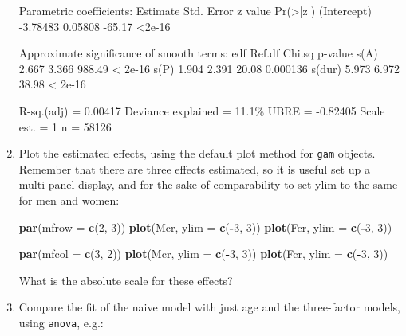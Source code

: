 \documentclass[
]{book}
\newenvironment{Shaded}{\begin{snugshade}}{\end{snugshade}}
\newcommand{\AttributeTok}[1]{\textcolor[rgb]{0.13,0.29,0.53}{#1}}
\newcommand{\DecValTok}[1]{\textcolor[rgb]{0.00,0.00,0.81}{#1}}
\newcommand{\FunctionTok}[1]{\textcolor[rgb]{0.13,0.29,0.53}{\textbf{#1}}}
\newcommand{\NormalTok}[1]{#1}
\newcommand{\SpecialCharTok}[1]{\textcolor[rgb]{0.81,0.36,0.00}{\textbf{#1}}}
\begin{document}
\begin{enumerate}
\begin{Shaded}
\begin{Highlighting}[]
\NormalTok{Parametric coefficients:}
\NormalTok{            Estimate Std. Error z value Pr(\textgreater{}|z|)}
\NormalTok{(Intercept) {-}3.78483    0.05808  {-}65.17   \textless{}2e{-}16}

\NormalTok{Approximate significance of smooth terms:}
\NormalTok{         edf Ref.df Chi.sq  p{-}value}
\NormalTok{s(A)   2.667  3.366 988.49  \textless{} 2e{-}16}
\NormalTok{s(P)   1.904  2.391  20.08 0.000136}
\NormalTok{s(dur) 5.973  6.972  38.98  \textless{} 2e{-}16}

\NormalTok{R{-}sq.(adj) =  0.00417   Deviance explained = 11.1\%}
\NormalTok{UBRE = {-}0.82405  Scale est. = 1         n = 58126}
\end{Highlighting}
\end{Shaded}
\item
  Plot the estimated effects, using the default plot method for
  \texttt{gam} objects. Remember that there are three effects
  estimated, so it is useful set up a multi-panel display, and for
  the sake of comparability to set ylim to the same for men and women:

\begin{Shaded}
\begin{Highlighting}[]
\FunctionTok{par}\NormalTok{(}\AttributeTok{mfrow =} \FunctionTok{c}\NormalTok{(}\DecValTok{2}\NormalTok{, }\DecValTok{3}\NormalTok{))}
\FunctionTok{plot}\NormalTok{(Mcr, }\AttributeTok{ylim =} \FunctionTok{c}\NormalTok{(}\SpecialCharTok{{-}}\DecValTok{3}\NormalTok{, }\DecValTok{3}\NormalTok{))}
\FunctionTok{plot}\NormalTok{(Fcr, }\AttributeTok{ylim =} \FunctionTok{c}\NormalTok{(}\SpecialCharTok{{-}}\DecValTok{3}\NormalTok{, }\DecValTok{3}\NormalTok{))}
\end{Highlighting}
\end{Shaded}

\begin{Shaded}
\begin{Highlighting}[]
\FunctionTok{par}\NormalTok{(}\AttributeTok{mfcol =} \FunctionTok{c}\NormalTok{(}\DecValTok{3}\NormalTok{, }\DecValTok{2}\NormalTok{))}
\FunctionTok{plot}\NormalTok{(Mcr, }\AttributeTok{ylim =} \FunctionTok{c}\NormalTok{(}\SpecialCharTok{{-}}\DecValTok{3}\NormalTok{, }\DecValTok{3}\NormalTok{))}
\FunctionTok{plot}\NormalTok{(Fcr, }\AttributeTok{ylim =} \FunctionTok{c}\NormalTok{(}\SpecialCharTok{{-}}\DecValTok{3}\NormalTok{, }\DecValTok{3}\NormalTok{))}
\end{Highlighting}
\end{Shaded}

  What is the absolute scale for these effects?
\item
  Compare the fit of the naive model with just age and the
  three-factor models, using \texttt{anova}, e.g.:


\end{enumerate}
\end{document}
